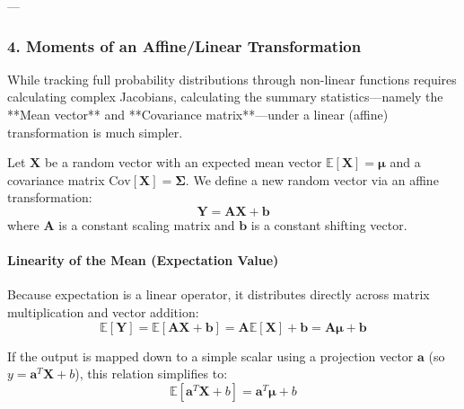 \documentclass{article}
\begin{document}
---

\subsubsection*{4. Moments of an Affine/Linear Transformation}

While tracking full probability distributions through non-linear functions requires calculating complex Jacobians, calculating the summary statistics—namely the **Mean vector** and **Covariance matrix**—under a linear (affine) transformation is much simpler.

Let $\mathbf{X}$ be a random vector with an expected mean vector $\mathbb{E}[\mathbf{X}] = \boldsymbol{\mu}$ and a covariance matrix $\text{Cov}[\mathbf{X}] = \boldsymbol{\Sigma}$. We define a new random vector via an affine transformation:
\begin{equation*}
\mathbf{Y} = \mathbf{A}\mathbf{X} + \mathbf{b}
\end{equation*}
where $\mathbf{A}$ is a constant scaling matrix and $\mathbf{b}$ is a constant shifting vector.

\paragraph{Linearity of the Mean (Expectation Value)}
Because expectation is a linear operator, it distributes directly across matrix multiplication and vector addition:
\begin{equation}
\mathbb{E}[\mathbf{Y}] = \mathbb{E}[\mathbf{A}\mathbf{X} + \mathbf{b}] = \mathbf{A}\mathbb{E}[\mathbf{X}] + \mathbf{b} = \mathbf{A}\boldsymbol{\mu} + \mathbf{b} \tag{222}
\end{equation}

If the output is mapped down to a simple scalar using a projection vector $\mathbf{a}$ (so $y = \mathbf{a}^T\mathbf{X} + b$), this relation simplifies to:
\begin{equation}
\mathbb{E}[\mathbf{a}^T\mathbf{X} + b] = \mathbf{a}^T\boldsymbol{\mu} + b \tag{223}
\end{equation}
\end{document}
